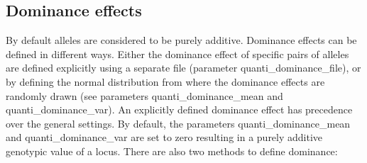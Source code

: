 \documentclass[letterpaper,12pt,oneside]{book}
\begin{document}
\subsection{Dominance effects}
\label{sub:DominanceEffects}
By default alleles are considered to be purely additive. Dominance effects can be defined in different ways. Either the dominance effect of specific pairs of alleles are defined explicitly using a separate file (parameter \textsf{quanti\_dominance\_file}), or by defining the normal distribution from where the dominance effects are randomly drawn (see parameters \textsf{quanti\_dominance\_mean} and \textsf{quanti\_dominance\_var}). An explicitly defined dominance effect has precedence over the general settings. By default, the parameters \textsf{quanti\_dominance\_mean} and \textsf{quanti\_dominance\_var} are set to zero resulting in a purely additive genotypic value of a locus. There are also two methods to define dominance:
\end{document}
